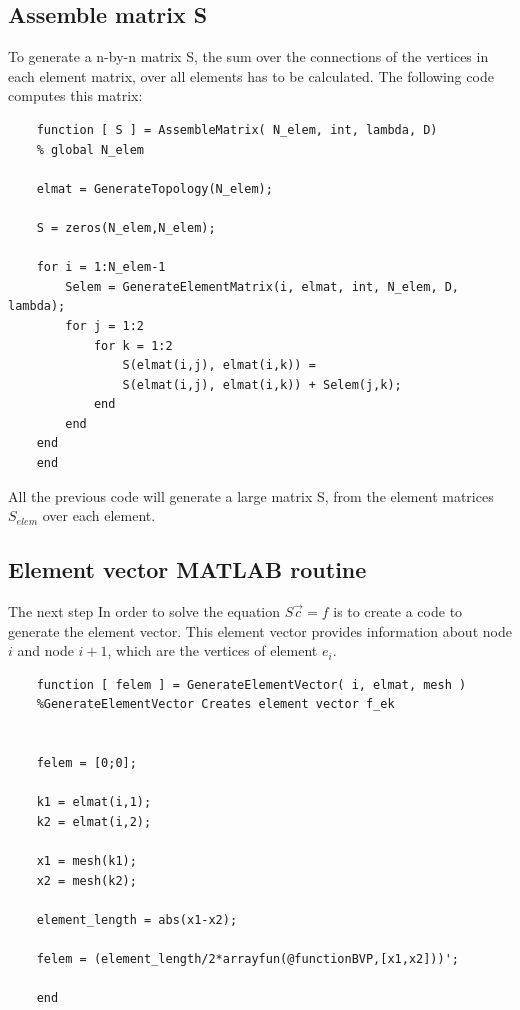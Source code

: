 \documentclass[a4paper]{report}
\begin{document}
\bigskip




\subsection{Assemble matrix S}
To generate a n-by-n matrix S, the sum over the connections of the vertices in each element matrix, over all elements has to be calculated. The following code computes this matrix:

\begin{lstlisting}
	function [ S ] = AssembleMatrix( N_elem, int, lambda, D)
	% global N_elem 
	
	elmat = GenerateTopology(N_elem);
	
	S = zeros(N_elem,N_elem);
	
	for i = 1:N_elem-1
		Selem = GenerateElementMatrix(i, elmat, int, N_elem, D, lambda);
		for j = 1:2
			for k = 1:2
				S(elmat(i,j), elmat(i,k)) =
				S(elmat(i,j), elmat(i,k)) +	Selem(j,k);
			end
		end
	end
	end

\end{lstlisting}



All the previous code will generate a large matrix S, from the element matrices $S_{elem}$ over each element.\\



\subsection{Element vector MATLAB routine}

The next step In order to solve the equation $S\vec{c}=f$ is to create a code to generate the element vector. This element vector provides information about node $i$ and node $i+1$, which are the vertices of element $e_i$.\\



\begin{lstlisting}
	function [ felem ] = GenerateElementVector( i, elmat, mesh )
	%GenerateElementVector Creates element vector f_ek
	
	
	felem = [0;0];
	
	k1 = elmat(i,1);
	k2 = elmat(i,2);
	
	x1 = mesh(k1);
	x2 = mesh(k2);
	
	element_length = abs(x1-x2);
	
	felem = (element_length/2*arrayfun(@functionBVP,[x1,x2]))';
	
	end
\end{lstlisting}
\end{document}
